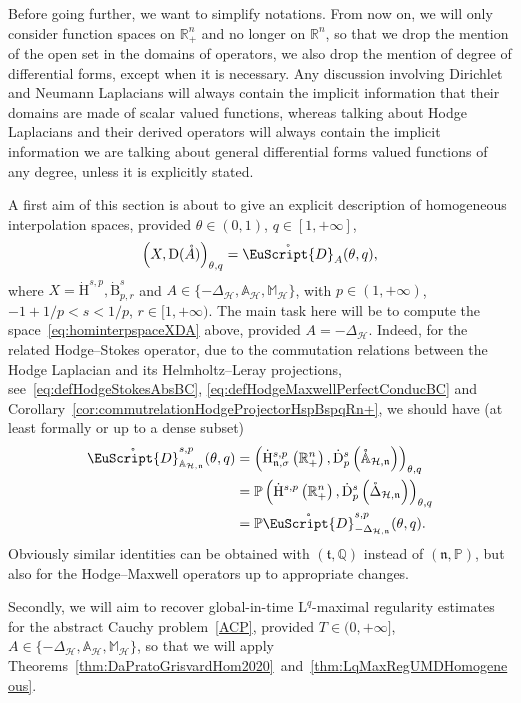 \documentclass[AHL,Unicode,longabstracts,published]{cedram}
\newcommand{\bbP}{\mathbb{P}}
\newcommand{\bbA}{\mathbb{A}}
\newcommand{\bbR}{\mathbb{R}}
\newcommand{\bbM}{\mathbb{M}}
\newcommand{\bbQ}{\mathbb{Q}}
\newcommand{\rmH}{\mathrm{H}}%
\newcommand{\rmB}{\mathrm{B}}
\newcommand{\rmD}{\mathrm{D}}
\newcommand{\rmL}{\mathrm{L}}
\newcommand{\rgA}{\mathring{A}}
\newcommand{\clH}{\mathcal{H}}
\newcommand{\fkn}{\mathfrak{n}}
\newcommand{\fkt}{\mathfrak{t}}
\newcommand{\rgeusD}{\mathring{\eus{D}}}
\newcommand{\eus}{\EuScript}
\begin{document}
Before going further, we want to simplify notations. From now on, we will only consider function spaces on $\bbR^n_+$ and no longer on $\bbR^n$, so that we drop the mention of the open set in the domains of operators, we also drop the mention of degree of differential forms, except when it is necessary. Any discussion involving Dirichlet and Neumann Laplacians will always contain the implicit information that their domains are made of scalar valued functions, whereas talking about Hodge Laplacians and their derived operators will always contain the implicit information we are talking about general differential forms valued functions of any degree, unless it is explicitly stated.

A first aim of this section is about to give an explicit description of homogeneous interpolation spaces, provided $\theta\in (0,1)$, $q\in [1,+\infty]$,
\begin{align}\label{eq:hominterpspaceXDA}
\left(X,\rmD(\rgA)\right)_{\theta,q} = \rgeusD_{A}(\theta,q),
\end{align}
where $X=\dot{\rmH}^{s,p},\dot{\rmB}^{s}_{p,r}$ and $A\in\{ -\Delta_{\clH},\bbA_{\clH},\bbM_\clH\}$, with $p\in(1,+\infty)$, $-1+1/p<s<1/p$, $r\in[1,+\infty)$. The main task here will be to compute the space~\eqref{eq:hominterpspaceXDA} above, provided $A=-\Delta_{\clH}$. Indeed, for the related Hodge--Stokes operator, due to the commutation relations between the Hodge Laplacian and its Helmholtz--Leray projections, see~\eqref{eq:defHodgeStokesAbsBC}, \eqref{eq:defHodgeMaxwellPerfectConducBC} and Corollary~\ref{cor:commutrelationHodgeProjectorHspBspqRn+}, we should have (at least formally or up to a dense subset)
\begin{align*}
\rgeusD^{s,p}_{\bbA_{\clH,\fkn}}(\theta,q) &= \left(\dot{\rmH}^{s,p}_{\fkn,\sigma}\left(\bbR^n_+\right),\dot{\rmD}^{s}_{p}\left(\mathring{\bbA}_{\clH,\fkn}\right)\right)_{\theta,q} \\
&= \bbP\left(\dot{\rmH}^{s,p}\left(\bbR^n_+\right),\dot{\rmD}^{s}_{p}\left(\mathring{\Delta}_{\clH,\fkn}\right)\right)_{\theta,q} \\
&= \bbP\rgeusD^{s,p}_{-{\Delta}_{\clH,\fkn}}(\theta,q).
\end{align*}
Obviously similar identities can be obtained with $(\fkt,\bbQ)$ instead of $(\fkn,\bbP)$, but also for the Hodge--Maxwell operators up to appropriate changes.

Secondly, we will aim to recover global-in-time $\rmL^q$-maximal regularity estimates for the abstract Cauchy problem~\eqref{ACP}, provided $T\in(0,+\infty]$, $A\in\{ -\Delta_{\clH},\bbA_{\clH},\bbM_\clH\}$, so that we will apply Theorems~\ref{thm:DaPratoGrisvardHom2020}~and~\ref{thm:LqMaxRegUMDHomogeneous}.
\end{document}
